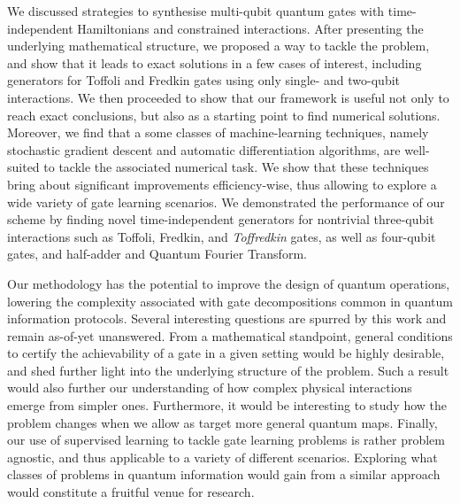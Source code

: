 We discussed strategies to synthesise multi-qubit quantum gates with time-independent Hamiltonians and constrained interactions.
After presenting the underlying mathematical structure, we proposed a way to tackle the problem, and show that it leads to exact solutions in a few cases of interest, including generators for Toffoli and Fredkin gates using only single- and two-qubit interactions.
We then proceeded to show that our framework is useful not only to reach exact conclusions, but also as a starting point to find numerical solutions.
Moreover, we find that a some classes of machine-learning techniques, namely stochastic gradient descent and automatic differentiation algorithms, are well-suited to tackle the associated numerical task. We show that these techniques bring about significant improvements efficiency-wise, thus allowing to explore a wide variety of gate learning scenarios.
We demonstrated the performance of our scheme by finding novel time-independent generators for nontrivial three-qubit interactions such as Toffoli, Fredkin, and \emph{Toffredkin} gates, as well as four-qubit gates, and half-adder and Quantum Fourier Transform.

Our methodology has the potential to improve the design of quantum operations,
lowering the complexity associated with gate decompositions common in quantum information protocols.
Several interesting questions are spurred by this work and remain as-of-yet unanswered. From a mathematical standpoint, general conditions to certify the achievability of a gate in a given setting would be highly desirable, and shed further light into the underlying structure of the problem.
Such a result would also further our understanding of how complex physical interactions emerge from simpler ones.
Furthermore, it would be interesting to study how the problem changes when we allow as target more general quantum maps.
Finally, our use of supervised learning to tackle gate learning problems is rather problem agnostic, and thus applicable to a variety of different scenarios. Exploring what classes of problems in quantum information would gain from a similar approach would constitute a fruitful venue for research.

